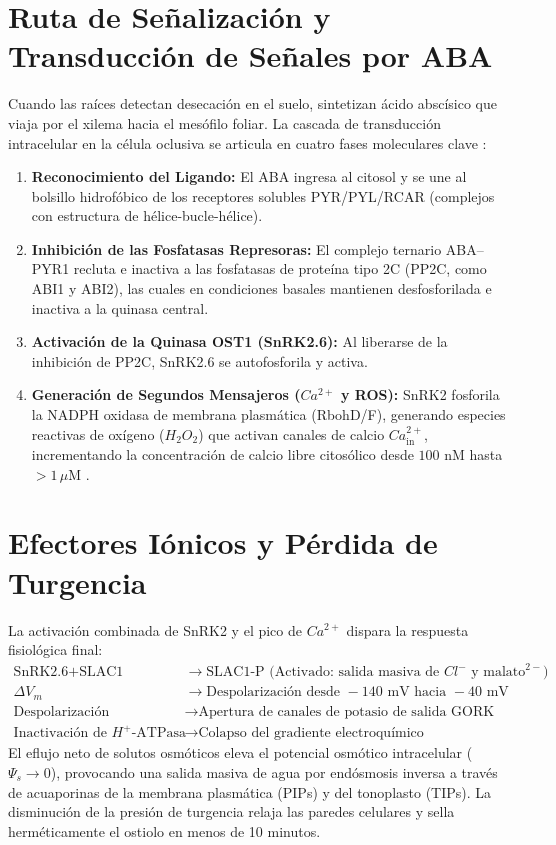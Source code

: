 \documentclass[spanish,letterpaper,oneside]{article}
\begin{document}
\section{Ruta de Señalización y Transducción de Señales por ABA}
Cuando las raíces detectan desecación en el suelo, sintetizan ácido abscísico que viaja por el xilema hacia el mesófilo foliar. La cascada de transducción intracelular en la célula oclusiva se articula en cuatro fases moleculares clave \parencite{lodish2016}:
\begin{enumerate}
    \item \textbf{Reconocimiento del Ligando:} El ABA ingresa al citosol y se une al bolsillo hidrofóbico de los receptores solubles PYR/PYL/RCAR (complejos con estructura de hélice-bucle-hélice).
    \item \textbf{Inhibición de las Fosfatasas Represoras:} El complejo ternario ABA--PYR1 recluta e inactiva a las fosfatasas de proteína tipo 2C (PP2C, como ABI1 y ABI2), las cuales en condiciones basales mantienen desfosforilada e inactiva a la quinasa central.
    \item \textbf{Activación de la Quinasa OST1 (SnRK2.6):} Al liberarse de la inhibición de PP2C, SnRK2.6 se autofosforila y activa.
    \item \textbf{Generación de Segundos Mensajeros ($Ca^{2+}$ y ROS):} SnRK2 fosforila la NADPH oxidasa de membrana plasmática (RbohD/F), generando especies reactivas de oxígeno ($H_2O_2$) que activan canales de calcio $Ca^{2+}_{\text{in}}$, incrementando la concentración de calcio libre citosólico desde $100\text{ nM}$ hasta $>1\,\mu\text{M}$ \parencite{karp2014}.
\end{enumerate}

\section{Efectores Iónicos y Pérdida de Turgencia}
La activación combinada de SnRK2 y el pico de $Ca^{2+}$ dispara la respuesta fisiológica final:
\begin{align}
    \text{SnRK2.6} + \text{SLAC1} &\longrightarrow \text{SLAC1-P (Activado: salida masiva de } Cl^- \text{ y malato}^{2-}) \\
    \Delta V_m &\longrightarrow \text{Despolarización desde } -140\text{ mV} \text{ hacia } -40\text{ mV} \\
    \text{Despolarización} &\longrightarrow \text{Apertura de canales de potasio de salida GORK} \\
    \text{Inactivación de } H^+\text{-ATPasa} &\longrightarrow \text{Colapso del gradiente electroquímico}
\end{align}
El eflujo neto de solutos osmóticos eleva el potencial osmótico intracelular ($\Psi_s \to 0$), provocando una salida masiva de agua por endósmosis inversa a través de acuaporinas de la membrana plasmática (PIPs) y del tonoplasto (TIPs). La disminución de la presión de turgencia relaja las paredes celulares y sella herméticamente el ostiolo en menos de 10 minutos.
\end{document}
